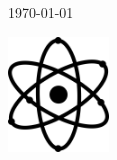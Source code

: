 \begin{titlepage}
	
	
	\vfill\vfill\vfill %
	
	{\large\today} %
	

	\vfill\vfill
	\includegraphics[width=0.2\textwidth]{LogoFysica.pdf}\\[1cm] %
	 
	
	\vfill %
\end{titlepage}
